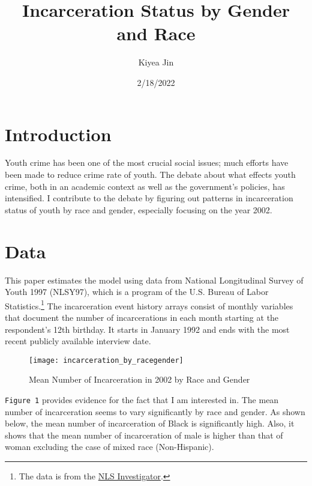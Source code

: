 \documentclass{article}
\author{Kiyea Jin}
\title{Incarceration Status by Gender and Race}
\date{2/18/2022}
\begin{document}
\maketitle

\section{Introduction}

Youth crime has been one of the most crucial social issues; much efforts have been made to reduce crime rate of youth. The debate about what effects youth crime, both in an academic context as well as the government's policies, has intensified. I contribute to the debate by figuring out patterns in incarceration status of youth by race and gender, especially focusing on the year 2002. 


\section{Data}

This paper estimates the model using data from National Longitudinal Survey of Youth 1997 (NLSY97), which is a program of the U.S. Bureau of Labor Statistics.\footnote{The data is from the \href{https://www.nlsinfo.org/investigator/pages/search}{NLS Investigator}.} The incarceration event history arrays consist of monthly variables that document the number of incarcerations in each month starting at the respondent's 12th birthday. It starts in January 1992 and ends with the most recent publicly available interview date.

 
\begin{figure}[H]
    \begin{center}
        \texttt{[image: incarceration\_by\_racegender]}
    \end{center}
    \caption{Mean Number of Incarceration in 2002 by Race and Gender}
    \label{fig:graph}
\end{figure}


\newpage

\texttt{Figure 1} provides evidence for the fact that I am interested in. The mean number of incarceration seems to vary significantly by race and gender. As shown below, the mean number of  incarceration of Black is significantly high. Also, it shows that the mean number of incarceration of male is higher than that of woman excluding the case of mixed race (Non-Hispanic).  

\vspace{2cm}
\end{document}
